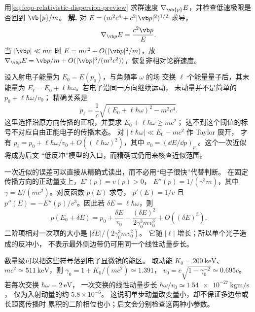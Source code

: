 \par
\begin{workedexample}
用\cref{eq:feqo-relativistic-dispersion-preview} 求群速度 \(\nabla_{\vb{p}}E\)，并检查低速极限是否回到 \(\vb{p}/m\)。
\textbf{解.} 对 \(E=(m^2c^4+c^2|\vb p|^2)^{1/2}\) 求导，
\[
\nabla_{\vb p}E=\frac{c^2\vb p}{E}.
\]
当 \(|\vb p|\ll mc\) 时 \(E=mc^2+O(|\vb p|^2/m)\)，故 \(\nabla_{\vb p}E=\vb p/m+O(|\vb p|^3/(m^3c^2))\)，恢复非相对论群速度。
\end{workedexample}
\par
设入射电子能量为 \(E_0=E(p_0)\)，与角频率 \(\omega\) 的场
交换 \(\ell\) 个能量量子后，其末能量为
\(E_\ell=E_0+\ell\hbar\omega\)。若电子沿同一方向继续运动，
末动量并不是简单的 \(p_0+\ell\hbar\omega/v_0\)；
精确关系是
\[
p_\ell=\frac1c\sqrt{(E_0+\ell\hbar\omega)^2-m^2c^4}.
\]
这里选择沿原方向传播的正根，并要求
\(E_0+\ell\hbar\omega\ge mc^2\)；
达不到这个阈值的标号不对应自由正能电子的传播末态。
对 \(|\ell\hbar\omega|\ll E_0-mc^2\) 作 Taylor 展开，
才有 \(p_\ell=p_0+\ell\hbar\omega/v_0
+O((\ell\hbar\omega)^2)\)，其中
\(v_0=(\dd E/\dd p)_{p_0}\)。这个一次近似将成为后文
“低反冲”模型的入口，而精确式仍用来核查近似范围。

一次近似的误差可以直接从精确式读出，而不必用“电子很快”代替判断。
在固定传播方向的正动量支上，\(E'(p)=v(p)>0\)，
\(E''(p)=1/(\gamma^3m)\)，其中
\(\gamma=E/(mc^2)\)。对反函数 \(p(E)\) 求导，
\(p'(E)=1/v\) 且
\(p''(E)=-E''(p)/v^3\)。因此若
\(\delta E=\ell\hbar\omega\)，则
\begin{equation}
p(E_0+\delta E)=p_0+\frac{\delta E}{v_0}
-\frac{(\delta E)^2}{2\gamma_0^3mv_0^3}
+O((\delta E)^3).
\label{eq:feqo-sideband-momentum-recoil}
\end{equation}
二阶项相对一次项的大小是
\(|\delta E|/(2\gamma_0^3mv_0^2)\)。
它随 \(|\ell|\) 增长；所以单个光子造成的反冲小，
不表示最外侧边带仍可用同一个线性动量步长。

数量级可以把这些符号落到电子显微镜的能区。
取动能 \(K_0=\SI{200}{\kilo\electronvolt}\)、
\(mc^2\simeq\SI{511}{\kilo\electronvolt}\)，则
\(\gamma_0=1+K_0/(mc^2)\simeq1.391\)，
\(v_0=c\sqrt{1-\gamma_0^{-2}}\simeq0.695c\)。
若每次交换 \(\hbar\omega=\SI{2}{\electronvolt}\)，
一次交换的线性动量步长
\(\hbar\omega/v_0\simeq
\SI{1.54e-27}{\kilogram\metre\per\second}\)，
仅为入射动量的约 \(5.8\times10^{-6}\)。
这说明单步动量改变量小，却不保证多边带或长距离传播时
累积的二阶相位也小；后文会分别检查这两种小参数。


